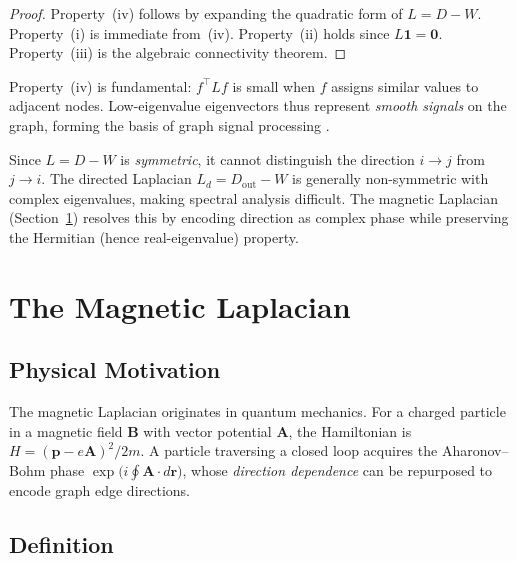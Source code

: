 \documentclass[twoside,11pt]{article}
\newcommand{\bone}{\mathbf{1}}
\begin{document}
\begin{proof}
Property~(iv) follows by expanding the quadratic form of $L=D-W$.
Property~(i) is immediate from~(iv).  Property~(ii) holds since
$L\bone=\mathbf{0}$.  Property~(iii) is the algebraic connectivity
theorem.
\end{proof}

Property~(iv) is fundamental: $f^\top Lf$ is small when $f$ assigns
similar values to adjacent nodes.  Low-eigenvalue eigenvectors thus
represent \emph{smooth signals} on the graph, forming the basis of graph
signal processing \citep{Shuman2013}.

\begin{remark}
\label{rem:undirected-limit}
Since $L=D-W$ is \emph{symmetric}, it cannot distinguish the direction
$i\to j$ from $j\to i$.  The directed Laplacian $L_d=D_{\mathrm{out}}-W$
is generally non-symmetric with complex eigenvalues, making spectral
analysis difficult.  The magnetic Laplacian (Section~\ref{sec:magnetic})
resolves this by encoding direction as complex phase while preserving the
Hermitian (hence real-eigenvalue) property.
\end{remark}

\section{The Magnetic Laplacian}
\label{sec:magnetic}

\subsection{Physical Motivation}

The magnetic Laplacian originates in quantum mechanics.  For a charged
particle in a magnetic field $\mathbf{B}$ with vector potential
$\mathbf{A}$, the Hamiltonian is
$H=(\mathbf{p}-e\mathbf{A})^2/2m$.  A particle traversing a closed loop
acquires the Aharonov--Bohm phase
$\exp\!\bigl(i\oint\mathbf{A}\cdot d\mathbf{r}\bigr)$, whose
\emph{direction dependence} can be repurposed to encode graph edge
directions.

\subsection{Definition}
\end{document}
